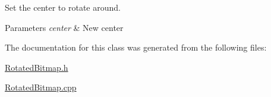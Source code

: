 Set the center to rotate around. 


\begin{DoxyParams}{Parameters}
{\em center} & New center \\
\hline
\end{DoxyParams}


The documentation for this class was generated from the following files\+:\begin{DoxyCompactItemize}
\item 
\hyperlink{_rotated_bitmap_8h}{Rotated\+Bitmap.\+h}\item 
\hyperlink{_rotated_bitmap_8cpp}{Rotated\+Bitmap.\+cpp}\end{DoxyCompactItemize}
